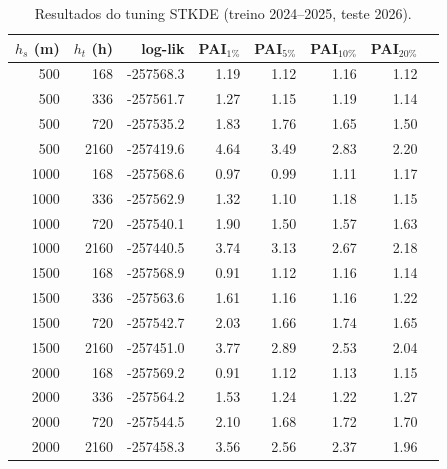 \begin{table}[htb]
\centering
\caption{Resultados do tuning STKDE (treino 2024--2025, teste 2026).}
\label{tab:stkde_tuning}
\small
\begin{tabular}{rrrrrrrr}
\toprule
$h_s$ (m) & $h_t$ (h) & log-lik & PAI$_{1\%}$ & PAI$_{5\%}$ & PAI$_{10\%}$ & PAI$_{20\%}$ \\
\midrule
500 & 168 & -257568.3 & 1.19 & 1.12 & 1.16 & 1.12 \\
500 & 336 & -257561.7 & 1.27 & 1.15 & 1.19 & 1.14 \\
500 & 720 & -257535.2 & 1.83 & 1.76 & 1.65 & 1.50 \\
500 & 2160 & -257419.6 & 4.64 & 3.49 & 2.83 & 2.20 \\
1000 & 168 & -257568.6 & 0.97 & 0.99 & 1.11 & 1.17 \\
1000 & 336 & -257562.9 & 1.32 & 1.10 & 1.18 & 1.15 \\
1000 & 720 & -257540.1 & 1.90 & 1.50 & 1.57 & 1.63 \\
1000 & 2160 & -257440.5 & 3.74 & 3.13 & 2.67 & 2.18 \\
1500 & 168 & -257568.9 & 0.91 & 1.12 & 1.16 & 1.14 \\
1500 & 336 & -257563.6 & 1.61 & 1.16 & 1.16 & 1.22 \\
1500 & 720 & -257542.7 & 2.03 & 1.66 & 1.74 & 1.65 \\
1500 & 2160 & -257451.0 & 3.77 & 2.89 & 2.53 & 2.04 \\
2000 & 168 & -257569.2 & 0.91 & 1.12 & 1.13 & 1.15 \\
2000 & 336 & -257564.2 & 1.53 & 1.24 & 1.22 & 1.27 \\
2000 & 720 & -257544.5 & 2.10 & 1.68 & 1.72 & 1.70 \\
2000 & 2160 & -257458.3 & 3.56 & 2.56 & 2.37 & 1.96 \\
\bottomrule
\end{tabular}
\end{table}
